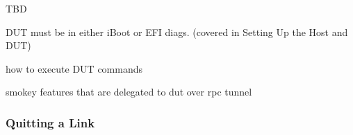 TBD

DUT must be in either iBoot or EFI diags. (covered in Setting Up the Host and DUT)

how to execute DUT commands

smokey features that are delegated to dut over rpc tunnel

\begin{comment}

Smokey Simulator takes all the same arguments that the "smokey" EFI command
supports.  In addition, it accepts three that are unique to the simulation
environment.  All three are technically optional.

	SmokeySimulator
		/path/to/sequence/directory
		--link /path/to/uart
		--shared /path/to/Blaze/Smokey/Shared
		--diags /path/to/diags/img3/or/im4p 

--link tells the simulator to connect to the target at the host file system’s device node
--shared allows direct use of platform-agnostic code on Blaze
--diags tells the simulator to boot the specific diags image when the target device is not in EFI

The --link option invokes the new "link" feature.  Its argument is a serial
device on the host file system, the same as the -d argument to nanokdp.  For
Kong, the serial interface has a path like /dev/cu.kong-20063F.  The nanokdp
utility can be used to test whether the path you want to use is valid:

	nanokdp -d /dev/cu.kong-20063F

Specifying --link causes Smokey Simulator to open the UART and issue commands
to query the state of the the DUT and bring the DUT into EFI.  It also tells
the simulator to create an RPC tunnel in order to hand off device-specific
commands to the DUT.

The --shared argument is optional.  The default is a directory named "Shared"
relative to the current working directory.  Each --shared argument adds to the
default.

Note that --diags only affects the transition from iBoot into EFI.  If the DUT
is already in EFI, the specified image is not loaded.  If this is an issue,
make sure to manually reset into iBoot beforehand.  Also note that --diags
requires usbterm to be running in the background.


\end{comment}

\subsubsection{Quitting a Link}


